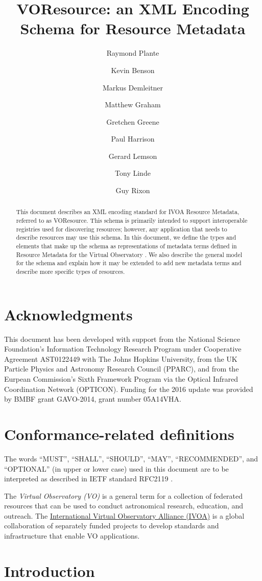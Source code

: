 \documentclass[11pt,a4paper]{ivoa}
\title{VOResource: an XML Encoding Schema for Resource Metadata}
\author[http://www.ivoa.net/twiki/bin/view/IVOA/RayPlante]{Raymond Plante}
\author[http://www.ivoa.net/twiki/bin/view/IVOA/KevinBenson]{Kevin Benson}
\author[http://www.ivoa.net/twiki/bin/view/IVOA/MarkusDemleitner]{Markus Demleitner}
\author[http://www.ivoa.net/twiki/bin/view/IVOA/MatthewGraham]{Matthew Graham}
\author[http://www.ivoa.net/twiki/bin/view/IVOA/GretchenGreene]{Gretchen Greene}
\author[http://www.ivoa.net/twiki/bin/view/IVOA/PaulHarrison]{Paul Harrison}
\author[http://www.ivoa.net/twiki/bin/view/IVOA/GerardLemson]{Gerard Lemson}
\author[http://www.ivoa.net/twiki/bin/view/IVOA/TonyLinde]{Tony Linde}
\author[http://www.ivoa.net/twiki/bin/view/IVOA/GuyRixon]{Guy Rixon}
\begin{document}
\begin{abstract}
This document describes an XML encoding standard for IVOA Resource
Metadata, referred to as VOResource.  This schema is primarily
intended to support interoperable registries used for discovering
resources; however, any application that needs to describe resources
may use this schema.  In this document, we define the types and
elements that make up the schema as representations of metadata terms
defined in Resource Metadata for the Virtual Observatory
\citep{2007ivoa.spec.0302H}.  We also describe the general model for the
schema and explain how it may be extended to add new metadata terms and
describe more specific types of resources.  
\end{abstract}


\section*{Acknowledgments}

This document has been developed with support from the
National Science Foundation's
Information Technology Research Program under Cooperative Agreement
AST0122449 with The Johns Hopkins University, from the
UK Particle Physics and Astronomy
Research Council (PPARC), and from the
Eurpean Commission's Sixth
Framework Program via the 
Optical Infrared Coordination Network (OPTICON).  Funding for the 2016
update was provided by BMBF grant GAVO-2014, grant number 05A14VHA.

\section*{Conformance-related definitions}

The words ``MUST'', ``SHALL'', ``SHOULD'', ``MAY'', ``RECOMMENDED'', and
``OPTIONAL'' (in upper or lower case) used in this document are to be
interpreted as described in IETF standard RFC2119 \citep{std:RFC2119}.

The \emph{Virtual Observatory (VO)} is a
general term for a collection of federated resources that can be used
to conduct astronomical research, education, and outreach.
The \href{http://www.ivoa.net}{International
Virtual Observatory Alliance (IVOA)} is a global
collaboration of separately funded projects to develop standards and
infrastructure that enable VO applications.


\section{Introduction}
\end{document}
